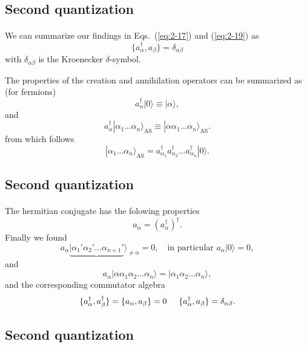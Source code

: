 \documentclass[%
twoside,                 %
final,                   %
10pt]{article}
\begin{document}
\subsection*{Second quantization}

\paragraph{}
We can summarize  our findings in Eqs.~(\ref{eq:2-17}) and (\ref{eq:2-19}) as 
\begin{equation}
	\{a_\alpha^{\dagger},a_\beta \} = \delta_{\alpha\beta} \label{eq:2-20}
\end{equation}
with  $\delta_{\alpha\beta}$ is the Kroenecker $\delta$-symbol.

The properties of the creation and annihilation operators can be summarized as (for fermions)
\[
	a_\alpha^{\dagger}|0\rangle \equiv  |\alpha\rangle,
\]
and
\[
	a_\alpha^{\dagger}|\alpha_1\dots \alpha_n\rangle_{\mathrm{AS}} \equiv  |\alpha\alpha_1\dots \alpha_n\rangle_{\mathrm{AS}}. 
\]
from which follows
\[
        |\alpha_1\dots \alpha_n\rangle_{\mathrm{AS}} = a_{\alpha_1}^{\dagger} a_{\alpha_2}^{\dagger} \dots a_{\alpha_n}^{\dagger} |0\rangle.
\]




\subsection*{Second quantization}

\paragraph{}
The hermitian conjugate has the folowing properties
\[
        a_{\alpha} = ( a_{\alpha}^{\dagger} )^{\dagger}.
\]
Finally we found 
\[
	a_\alpha\underbrace{|\alpha_1'\alpha_2' \dots \alpha_{n+1}'}\rangle_{\neq \alpha} = 0, \quad
		\textrm{in particular } a_\alpha |0\rangle = 0,
\]
and
\[
 a_\alpha |\alpha\alpha_1\alpha_2 \dots \alpha_{n}\rangle = |\alpha_1\alpha_2 \dots \alpha_{n}\rangle,
\]
and the corresponding commutator algebra
\[
	\{a_{\alpha}^{\dagger},a_{\beta}^{\dagger}\} = \{a_{\alpha},a_{\beta}\} = 0 \hspace{0.5cm} 
\{a_\alpha^{\dagger},a_\beta \} = \delta_{\alpha\beta}.
\]




\subsection*{Second quantization}
\end{document}
